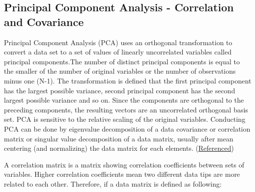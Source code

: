 \documentclass{tufte-handout}
\begin{document}
\subsection{Principal Component Analysis - Correlation and Covariance}
Principal Component Analysis (PCA) uses an orthogonal transformation to convert a data set to a set of values of linearly uncorrelated variables called principal components.The number of distinct principal components is equal to the smaller of the number of original variables or the number of observations minus one (N-1). The transformation is defined that the first principal component has the largest possible variance, second principal component has the second largest possible variance and so on. Since the components are orthogonal to the preceding components, the resulting vectors are an uncorrelated orthogonal basis set. PCA is sensitive to the relative scaling of the original variables. Conducting PCA can be done by eigenvalue decomposition of a data covariance or correlation matrix or singular value decomposition of a data matrix, usually after mean centering (and normalizing) the data matrix for each elements. (\href{https://en.wikipedia.org/wiki/Principal_component_analysis}{Referenced})

A correlation matrix is a matrix showing correlation coefficients between sets of variables. Higher correlation coefficients mean two different data tips are more related to each other. Therefore, if a data matrix is defined as following:
\end{document}
